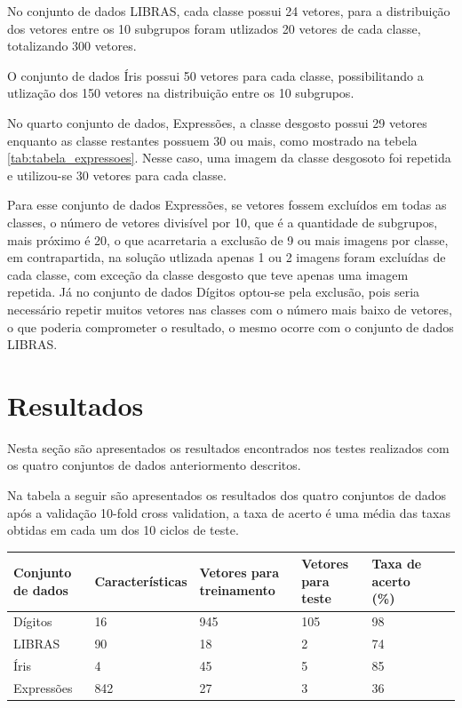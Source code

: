 No conjunto de dados LIBRAS, cada classe possui 24 vetores, para a distribuição dos vetores entre os 10 subgrupos foram utlizados 20 vetores de cada classe, totalizando 300 vetores.

O conjunto de dados Íris possui 50 vetores para cada classe, possibilitando a utlização dos 150 vetores na distribuição entre os 10 subgrupos.

No quarto conjunto de dados, Expressões, a classe desgosto possui 29 vetores enquanto as classe restantes possuem 30 ou mais, como mostrado na tebela \ref{tab:tabela_expressoes}. Nesse caso, uma imagem da classe desgosoto foi repetida e utilizou-se 30 vetores para cada classe. 

Para esse conjunto de dados Expressões, se vetores fossem excluídos em todas as classes, o número de vetores divisível por 10, que é a quantidade de subgrupos, mais próximo é 20, o que acarretaria a exclusão de 9 ou mais imagens por classe, em contrapartida, na solução utlizada apenas 1 ou 2 imagens foram excluídas de cada classe, com exceção da classe desgosto que teve apenas uma imagem repetida. Já no conjunto de dados Dígitos optou-se pela exclusão, pois seria necessário repetir muitos vetores nas classes com o número mais baixo de vetores, o que poderia comprometer o resultado, o mesmo ocorre com o conjunto de dados LIBRAS.

\section{Resultados}
Nesta seção são apresentados os resultados encontrados nos testes realizados com os quatro conjuntos de dados anteriormento descritos. 

Na tabela a seguir são apresentados os resultados dos quatro conjuntos de dados após a validação 10-fold cross validation, a taxa de acerto é uma média das taxas obtidas em cada um dos 10 ciclos de teste. 

\begin{table}[h!]
	\begin{tabular}{|l|l|l|l|p{2cm}|p{3cm}|p{2cm}|}
        \hline
	Conjunto de dados  & Características & Vetores para treinamento & Vetores para teste & Taxa de acerto (\%)\\ \hline
    	Dígitos    &        16       & 945   & 105 & 98\\ \hline
   	LIBRAS     &        90       &  18   &   2 & 74\\ \hline
    	Íris       &         4       &  45   &   5 & 85\\ \hline
    	Expressões &       842       &  27   &   3 & 36\\ \hline
	\end{tabular}
	\label{tab:resultados}
\end{table}

